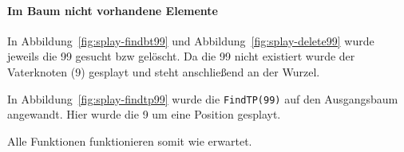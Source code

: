 \paragraph{Im Baum nicht vorhandene Elemente}

In Abbildung~\ref{fig:splay-findbt99} und Abbildung~\ref{fig:splay-delete99} wurde jeweils die
99 gesucht bzw gelöscht.
Da die 99 nicht existiert wurde der Vaterknoten (9) gesplayt und steht anschließend an der Wurzel.

In Abbildung~\ref{fig:splay-findtp99} wurde die \verb|FindTP(99)| auf den Ausgangsbaum angewandt.
Hier wurde die 9 um eine Position gesplayt.

Alle Funktionen funktionieren somit wie erwartet.

\begin{figure}[hbt]
    \centering

\end{figure}
